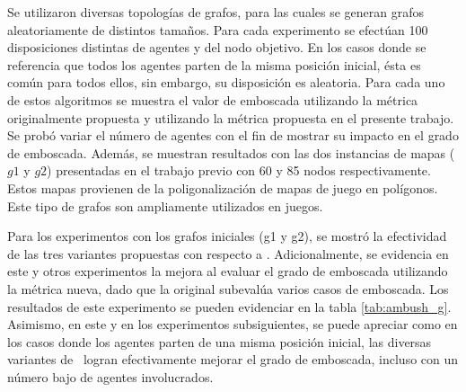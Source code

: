 Se utilizaron diversas topolog\'ias de grafos, para las cuales
se generan grafos aleatoriamente de distintos tamaños. Para cada
experimento se efect\'uan 100 disposiciones distintas de agentes
y del nodo objetivo. En los casos donde se referencia
que todos los agentes parten de la misma posici\'on inicial, \'esta es
com\'un para todos ellos, sin embargo, su disposici\'on es aleatoria.
Para cada uno de estos algoritmos se muestra el valor de emboscada
utilizando la m\'etrica originalmente propuesta y utilizando la
m\'etrica propuesta en el presente trabajo. Se prob\'o variar el
n\'umero de agentes con el fin de mostrar su impacto en el grado de emboscada.
Adem\'as, se muestran resultados con las dos instancias de mapas ($g1$ y $g2$)
presentadas en el trabajo previo \cite{FGC12} con 60 y 85 nodos
respectivamente. Estos mapas provienen de la poligonalizaci\'on de mapas
de juego en pol\'igonos. Este tipo de grafos son ampliamente utilizados
en juegos\cite{MF09}.

Para los experimentos con los grafos iniciales (g1 y g2), se mostr\'o
la efectividad de las tres variantes propuestas con respecto a \astar.
Adicionalmente, se evidencia en este y otros experimentos la mejora
al evaluar el grado de emboscada utilizando la m\'etrica nueva, dado
que la original subeval\'ua va\-rios casos de emboscada.
Los resultados de este experimento se pueden evidenciar en la tabla
\ref{tab:ambush_g}. Asimismo, en este y en los experimentos subsiguientes,
se puede apreciar como en los casos donde los agentes parten de una misma
posici\'on inicial, las diversas variantes de \ambush\ logran efectivamente
mejorar el grado de emboscada, incluso con un n\'umero bajo de agentes
involucrados.



